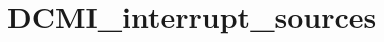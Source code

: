 \hypertarget{group___d_c_m_i__interrupt__sources}{\section{D\-C\-M\-I\-\_\-interrupt\-\_\-sources}
\label{group___d_c_m_i__interrupt__sources}
}
